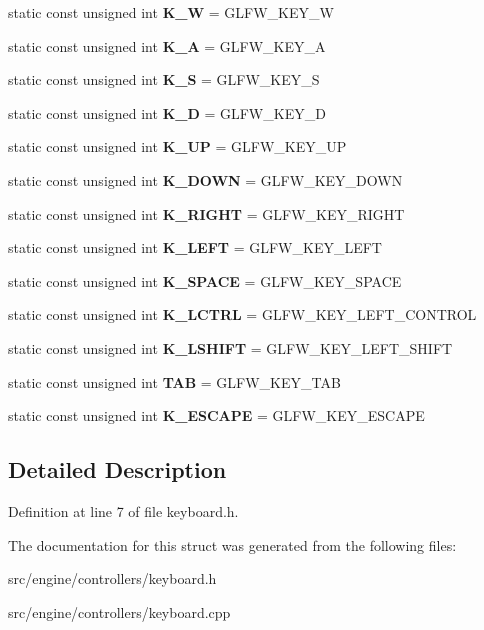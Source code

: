 \begin{DoxyCompactItemize}
\item 
\mbox{\label{struct_keyboard_a285abf01c80e75a1f7f7cec99b7bda19}} 
static const unsigned int {\bfseries K\+\_\+W} = G\+L\+F\+W\+\_\+\+K\+E\+Y\+\_\+W
\item 
\mbox{\label{struct_keyboard_afe601de6279cee0f160ae6e7aca2223e}} 
static const unsigned int {\bfseries K\+\_\+A} = G\+L\+F\+W\+\_\+\+K\+E\+Y\+\_\+A
\item 
\mbox{\label{struct_keyboard_ade9acf7835fdf66a7c380ad373604ec4}} 
static const unsigned int {\bfseries K\+\_\+S} = G\+L\+F\+W\+\_\+\+K\+E\+Y\+\_\+S
\item 
\mbox{\label{struct_keyboard_afeafe210b1b1bdb17f47b4fb8313e433}} 
static const unsigned int {\bfseries K\+\_\+D} = G\+L\+F\+W\+\_\+\+K\+E\+Y\+\_\+D
\item 
\mbox{\label{struct_keyboard_a696b46ddd19f1cefa11a602239936143}} 
static const unsigned int {\bfseries K\+\_\+\+UP} = G\+L\+F\+W\+\_\+\+K\+E\+Y\+\_\+\+UP
\item 
\mbox{\label{struct_keyboard_aa96777cf2572f27dab0a6c91eccb67f1}} 
static const unsigned int {\bfseries K\+\_\+\+D\+O\+WN} = G\+L\+F\+W\+\_\+\+K\+E\+Y\+\_\+\+D\+O\+WN
\item 
\mbox{\label{struct_keyboard_a6e4a22888542898cd26eba8727df677f}} 
static const unsigned int {\bfseries K\+\_\+\+R\+I\+G\+HT} = G\+L\+F\+W\+\_\+\+K\+E\+Y\+\_\+\+R\+I\+G\+HT
\item 
\mbox{\label{struct_keyboard_a19cdb95ed3d7abe14a445f417c1d86fb}} 
static const unsigned int {\bfseries K\+\_\+\+L\+E\+FT} = G\+L\+F\+W\+\_\+\+K\+E\+Y\+\_\+\+L\+E\+FT
\item 
\mbox{\label{struct_keyboard_a7e03106ac364eb40f6084a093e028cf2}} 
static const unsigned int {\bfseries K\+\_\+\+S\+P\+A\+CE} = G\+L\+F\+W\+\_\+\+K\+E\+Y\+\_\+\+S\+P\+A\+CE
\item 
\mbox{\label{struct_keyboard_af6797d5f74f8a6e15d49a5294b8e1d4f}} 
static const unsigned int {\bfseries K\+\_\+\+L\+C\+T\+RL} = G\+L\+F\+W\+\_\+\+K\+E\+Y\+\_\+\+L\+E\+F\+T\+\_\+\+C\+O\+N\+T\+R\+OL
\item 
\mbox{\label{struct_keyboard_a5e8d486a256314fc0bbb7fe11990bce5}} 
static const unsigned int {\bfseries K\+\_\+\+L\+S\+H\+I\+FT} = G\+L\+F\+W\+\_\+\+K\+E\+Y\+\_\+\+L\+E\+F\+T\+\_\+\+S\+H\+I\+FT
\item 
\mbox{\label{struct_keyboard_a4ea4ccd7ee2f4efea8ea922a999a7dcd}} 
static const unsigned int {\bfseries T\+AB} = G\+L\+F\+W\+\_\+\+K\+E\+Y\+\_\+\+T\+AB
\item 
\mbox{\label{struct_keyboard_acceed211cb7478e2473f79a049bccf0b}} 
static const unsigned int {\bfseries K\+\_\+\+E\+S\+C\+A\+PE} = G\+L\+F\+W\+\_\+\+K\+E\+Y\+\_\+\+E\+S\+C\+A\+PE
\end{DoxyCompactItemize}


\subsection{Detailed Description}


Definition at line 7 of file keyboard.\+h.



The documentation for this struct was generated from the following files\+:\begin{DoxyCompactItemize}
\item 
src/engine/controllers/keyboard.\+h\item 
src/engine/controllers/keyboard.\+cpp\end{DoxyCompactItemize}
